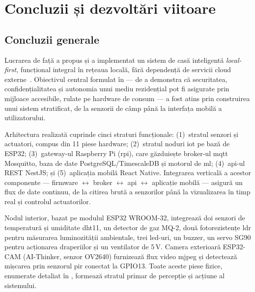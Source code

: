 \chapter{Concluzii și dezvoltări viitoare}
\label{ch:concluzii}

\section{Concluzii generale}

Lucrarea de față a propus și a implementat un sistem de casă inteligentă
\emph{local-first}, funcțional integral în rețeaua locală, fără dependență de
servicii cloud externe~\cite{kleppmann2019localfirst}.  Obiectivul central
formulat în  — de a demonstra că securitatea,
confidențialitatea și autonomia unui mediu rezidențial pot fi asigurate prin
mijloace accesibile, rulate pe hardware de consum — a fost atins prin
construirea unui sistem stratificat, de la senzorii de câmp până la interfața
mobilă a utilizatorului.

Arhitectura realizată cuprinde cinci straturi funcționale: (1)~stratul
senzori și actuatori, compus din 11 piese hardware; (2)~stratul noduri
\gls{iot} pe bază de \mbox{ESP32}; (3)~gateway-ul Raspberry Pi
(\gls{rpi}), care găzduiește broker-ul \gls{mqtt} Mosquitto, baza de date
PostgreSQL/TimescaleDB și motorul de \gls{ml}; (4)~\gls{api}-ul REST
NestJS; și (5)~aplicația mobilă React Native.  Integrarea verticală a
acestor componente — firmware \(\leftrightarrow\) broker \(\leftrightarrow\)
\gls{api} \(\leftrightarrow\) aplicație mobilă — asigură un flux de date
continuu, de la citirea brută a senzorilor până la vizualizarea în timp real
și controlul actuatorilor.

Nodul interior, bazat pe modulul ESP32 WROOM-32, integrează doi senzori de
temperatură și umiditate \gls{dht}11, un detector de gaz MQ-2, două
fotorezistențe \gls{ldr} pentru măsurarea luminozității ambientale, trei
\gls{led}-uri, un buzzer, un servo SG90 pentru acționarea draperiilor și un
ventilator de 5\,V.  Camera exterioară ESP32-CAM (AI-Thinker, senzor
OV2640) furnizează flux video \gls{mjpeg} și detectează mișcarea prin
senzorul \gls{pir} conectat la GPIO13.  Toate aceste piese fizice, enumerate
detaliat în , formează stratul primar de percepție
și acțiune al sistemului.

